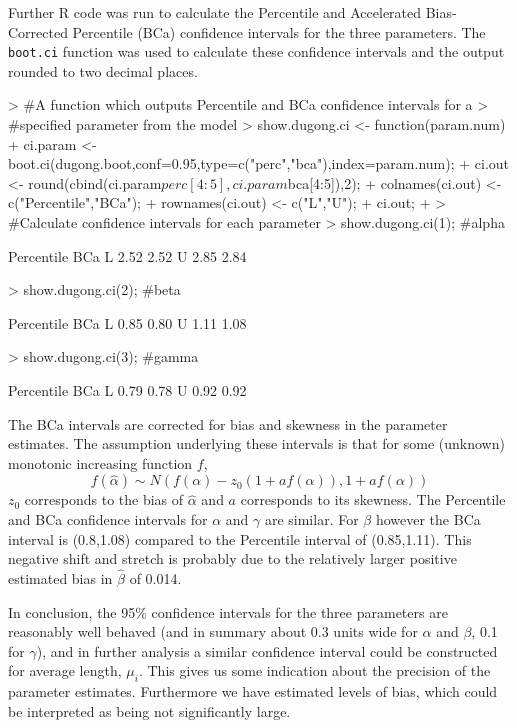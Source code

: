 \documentclass[a4paper,11pt]{article}
\begin{document}
Further R code was run to calculate the Percentile and Accelerated
Bias-Corrected Percentile (BCa) confidence intervals for the three
parameters. The \texttt{boot.ci} function was used to calculate these
confidence intervals and the output rounded to two decimal places.
\begin{Schunk}
\begin{Sinput}
> #A function which outputs Percentile and BCa confidence intervals for a
> #specified parameter from the model
> show.dugong.ci <- function(param.num) {
+     ci.param <- boot.ci(dugong.boot,conf=0.95,type=c("perc","bca"),index=param.num);
+     ci.out <- round(cbind(ci.param$perc[4:5],ci.param$bca[4:5]),2);
+     colnames(ci.out) <- c("Percentile","BCa");
+     rownames(ci.out) <- c("L","U");
+     ci.out;
+ }
> #Calculate confidence intervals for each parameter
> show.dugong.ci(1); #alpha
\end{Sinput}
\begin{Soutput}
  Percentile  BCa
L       2.52 2.52
U       2.85 2.84
\end{Soutput}
\begin{Sinput}
> show.dugong.ci(2); #beta
\end{Sinput}
\begin{Soutput}
  Percentile  BCa
L       0.85 0.80
U       1.11 1.08
\end{Soutput}
\begin{Sinput}
> show.dugong.ci(3); #gamma
\end{Sinput}
\begin{Soutput}
  Percentile  BCa
L       0.79 0.78
U       0.92 0.92
\end{Soutput}
\end{Schunk}

The BCa intervals are corrected for bias and skewness in the parameter
estimates. The assumption underlying these intervals is that for some
(unknown) monotonic increasing function $f$,
\begin{equation*}
  f(\hat\alpha) \sim N(f(\alpha)-z_0(1+af(\alpha)), 1+af(\alpha))
\end{equation*}
$z_0$ corresponds to the bias of $\hat\alpha$ and $a$ corresponds to
its skewness. The Percentile and BCa confidence intervals for
$\alpha$ and $\gamma$ are similar. For $\beta$ however the BCa
interval is (0.8,1.08) compared to the Percentile interval of
(0.85,1.11). This negative shift and stretch is probably due to the
relatively larger positive estimated bias in $\hat\beta$ of 0.014.

In conclusion, the 95\% confidence intervals for the three parameters
are reasonably well behaved (and in summary about 0.3 units wide for
$\alpha$ and $\beta$, 0.1 for $\gamma$), and in further analysis a
similar confidence interval could be constructed for average length,
$\mu_i$. This gives us some indication about the precision of the
parameter estimates. Furthermore we have estimated levels of bias,
which could be interpreted as being not significantly large.
\end{document}
